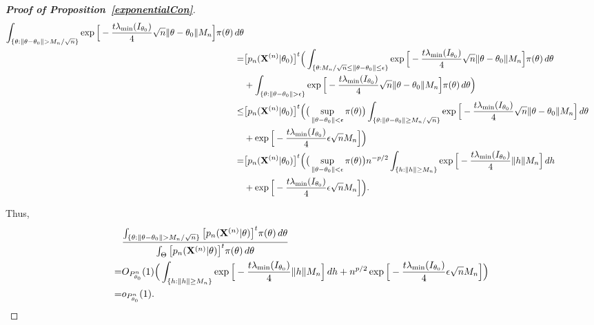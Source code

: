 \documentclass[11pt]{article}
\theoremstyle{plain}
\theoremstyle{definition}
\theoremstyle{remark}
\begin{document}
\begin{appendices}
\begin{proof}[\textbf{Proof of Proposition~\ref{exponentialCon}}]
$$\begin{aligned}
        \int_{\{\theta:\|\theta-\theta_0\|> M_n/\sqrt{n}\}} 
        \exp\Big[-\frac{t\lambda_{\min}(I_{\theta_0})}{4}\sqrt{n}\|\theta-\theta_0\|M_n\Big]
        \pi(\theta)\, d\theta
        \\
        =&
        \big[p_n(\BX^{(n)}|\theta_0)\big]^t 
        \Big(
        \int_{\{\theta:M_n/\sqrt{n}\leq \|\theta-\theta_0\|\leq \epsilon \}} 
        \exp\Big[-\frac{t\lambda_{\min}(I_{\theta_0})}{4}\sqrt{n}\|\theta-\theta_0\|M_n\Big]
        \pi(\theta)\, d\theta
        \\
        &+
        \int_{\{\theta:\|\theta-\theta_0\|> \epsilon\}} 
        \exp\Big[-\frac{t\lambda_{\min}(I_{\theta_0})}{4}\sqrt{n}\|\theta-\theta_0\|M_n\Big]
        \pi(\theta)\, d\theta
        \Big)
        \\
        \leq& 
        \big[p_n(\BX^{(n)}|\theta_0)\big]^t 
        \Big(
        \big(\sup_{\|\theta-\theta_0\|<\epsilon}\pi(\theta)\big)
        \int_{\{\theta: \|\theta-\theta_0\|\geq M_n/\sqrt{n}\}} 
        \exp\Big[-\frac{t\lambda_{\min}(I_{\theta_0})}{4}\sqrt{n}\|\theta-\theta_0\|M_n\Big]
        \, d\theta
        \\
        &+
        \exp\Big[-\frac{t\lambda_{\min}(I_{\theta_0})}{4}\epsilon\sqrt{n}M_n\Big]
        \Big)
        \\
        =& 
        \big[p_n(\BX^{(n)}|\theta_0)\big]^t 
        \Big(
        \big(\sup_{\|\theta-\theta_0\|<\epsilon}\pi(\theta)\big)
        n^{-p/2}
        \int_{\{h: \|h\|\geq M_n\}} 
        \exp\Big[-\frac{t\lambda_{\min}(I_{\theta_0})}{4}\|h\| M_n\Big]
        \, dh
        \\
        &+
        \exp\Big[-\frac{t\lambda_{\min}(I_{\theta_0})}{4}\epsilon\sqrt{n}M_n\Big]
        \Big).
    \end{aligned}
$$

Thus,
$$
    \begin{aligned}
        &\frac{
            \int_{\{\theta:\|\theta-\theta_0\|> M_n/\sqrt{n}\}} \big[p_n(\BX^{(n)}|\theta)\big]^t \pi(\theta)\, d\theta
        }
        {
            \int_{\Theta} \big[p_n(\BX^{(n)}|\theta)\big]^t \pi(\theta)\, d\theta
        }
        \\
        =&
        O_{P_{\theta_0}^n}(1)
        \Big(
        \int_{\{h: \|h\|\geq M_n\}} 
        \exp\Big[-\frac{t\lambda_{\min}(I_{\theta_0})}{4}\|h\| M_n\Big]
        \, dh
        +
        n^{p/2}\exp\Big[-\frac{t\lambda_{\min}(I_{\theta_0})}{4}\epsilon\sqrt{n}M_n\Big]
        \Big)
        \\
        =&o_{P^n_{\theta_0}}(1).
    \end{aligned}
$$


\end{proof}
\end{appendices}
\end{document}
